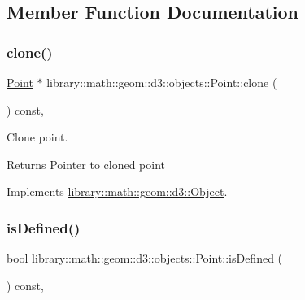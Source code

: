 \subsection{Member Function Documentation}
\mbox{\label{classlibrary_1_1math_1_1geom_1_1d3_1_1objects_1_1_point_a32aa1e233c6ac5341605961f6bf0f210}} 
\subsubsection{\texorpdfstring{clone()}{clone()}}
{\footnotesize\ttfamily \hyperlink{classlibrary_1_1math_1_1geom_1_1d3_1_1objects_1_1_point}{Point} $\ast$ library\+::math\+::geom\+::d3\+::objects\+::\+Point\+::clone (\begin{DoxyParamCaption}{ }\end{DoxyParamCaption}) const\hspace{0.3cm}{\ttfamily [override]}, {\ttfamily [virtual]}}



Clone point. 

\begin{DoxyReturn}{Returns}
Pointer to cloned point 
\end{DoxyReturn}


Implements \hyperlink{classlibrary_1_1math_1_1geom_1_1d3_1_1_object_a1a784c6b359e0eb97cd34fabc42f2f3f}{library\+::math\+::geom\+::d3\+::\+Object}.

\mbox{\label{classlibrary_1_1math_1_1geom_1_1d3_1_1objects_1_1_point_a9874289efeb457ada4b32d7eb1e012f6}} 
\subsubsection{\texorpdfstring{is\+Defined()}{isDefined()}}
{\footnotesize\ttfamily bool library\+::math\+::geom\+::d3\+::objects\+::\+Point\+::is\+Defined (\begin{DoxyParamCaption}{ }\end{DoxyParamCaption}) const\hspace{0.3cm}{\ttfamily [override]}, {\ttfamily [virtual]}}



